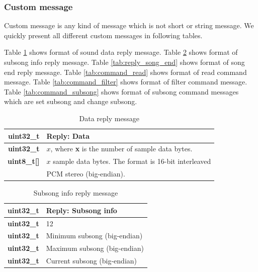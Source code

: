 \documentclass{article}
\begin{document}
\subsubsection{Custom message}

Custom message is any kind of message which is not short or string message.
We quickly present all different custom messages in following tables.

Table \ref{tab:reply_data} shows format of sound data reply message.
Table \ref{tab:reply_subsong_info} shows format of subsong info reply message.
Table \ref{tab:reply_song_end} shows format of song end reply message.
Table \ref{tab:command_read} shows format of read command message.
Table \ref{tab:command_filter} shows format of filter command message.
Table \ref{tab:command_subsong} shows format of subsong command messages
which are set subsong and change subsong.

\begin{table}
\begin{center}
\caption{Data reply message}
\label{tab:reply_data}
\begin{tabular}{|r|l|}
\hline
\textbf{uint32\_t} & Reply: Data \\
\hline
\textbf{uint32\_t} & $x$, where \textbf{x} is the number of sample
data bytes.\\
\hline
\textbf{uint8\_t[]} & $x$ sample data bytes. The format is 16-bit interleaved\\
& PCM stereo (big-endian).\\
\hline
\end{tabular}
\end{center}
\end{table}

\begin{table}
\begin{center}
\caption{Subsong info reply message}
\label{tab:reply_subsong_info}
\begin{tabular}{|r|l|}
\hline
\textbf{uint32\_t} & Reply: Subsong info \\
\hline
\textbf{uint32\_t} & 12\\
\hline
\textbf{uint32\_t} & Minimum subsong (big-endian)\\
\hline
\textbf{uint32\_t} & Maximum subsong (big-endian)\\
\hline
\textbf{uint32\_t} & Current subsong (big-endian)\\
\hline
\end{tabular}
\end{center}
\end{table}
\end{document}
